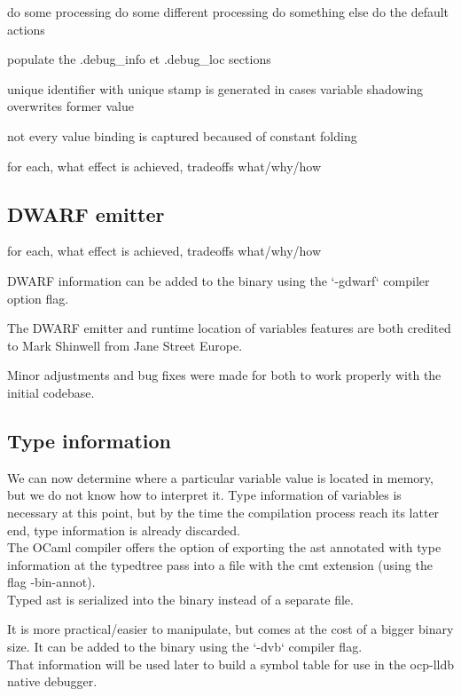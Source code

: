 \begin{algorithmic}[1]
    \State do some processing
    \State do some different processing
    \State do something else
    \Else
    \State do the default actions
    \EndIf
\end{algorithmic}

populate the  .debug\_info et .debug\_loc sections

unique identifier with unique stamp is generated in cases variable shadowing overwrites former value

not every value binding is captured becaused of constant folding


for each, what effect is achieved, tradeoffs
what/why/how

\subsection{DWARF emitter}

for each, what effect is achieved, tradeoffs
what/why/how

DWARF information can be added to the binary using the `-gdwarf` compiler option flag.

The DWARF emitter and runtime location of variables features are both credited to
Mark Shinwell from Jane Street Europe.

Minor adjustments and bug fixes were made for both to work properly with the initial codebase.

\subsection{Type information}

We can now determine where a particular variable value is located in memory, but
we do not know how to interpret it. Type information of variables is necessary
at this point, but by the time the compilation process reach its latter end,
type information is already discarded. \\

The OCaml compiler offers the option of exporting the \gls{ast} annotated with type
information at the typedtree pass into a file with the cmt extension (using the
flag -bin-annot). \\

Typed \gls{ast} is serialized into the binary instead of a separate file.

It is more practical/easier to manipulate, but comes at the cost of a bigger binary
size.
It can be added to the binary using the `-dvb` compiler flag.\\

That information will be used later to build a symbol table for use in the
ocp-lldb native debugger.

